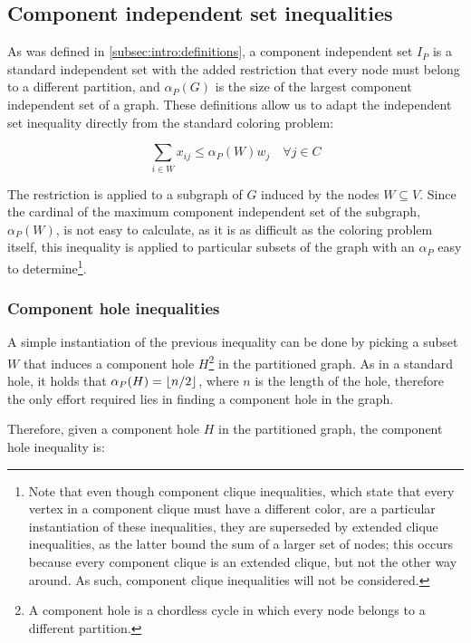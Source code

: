 \subsection{Component independent set inequalities}

As was defined in \ref{subsec:intro:definitions}, a component independent set $I_P$ is a standard independent set with the added restriction that every node must belong to a different partition, and $\alpha_P(G)$ is the size of the largest component independent set of a graph. These definitions allow us to adapt the independent set inequality directly from the standard coloring problem:

\begin{equation}
\label{ineq:ciset}
\sum _{i \in W} x_{ij} \leq \alpha_P(W) w_{j} \quad \forall j \in C
\end{equation}

The restriction is applied to a subgraph of $G$ induced by the nodes $W \subseteq V$. Since the cardinal of the maximum component independent set of the subgraph, $\alpha_P(W)$, is not easy to calculate, as it is as difficult as the coloring problem itself, this inequality is applied to particular subsets of the graph with an $\alpha_P$ easy to determine\footnote{Note that even though component clique inequalities, which state that every vertex in a component clique must have a different color, are a particular instantiation of these inequalities, they are superseded by extended clique inequalities, as the latter bound the sum of a larger set of nodes; this occurs because every component clique is an extended clique, but not the other way around. As such, component clique inequalities will not be considered.}.

\subsubsection{Component hole inequalities}

A simple instantiation of the previous inequality can be done by picking a subset $W$ that induces a component hole $H$\footnote{A component hole is a chordless cycle in which every node belongs to a different partition.} in the partitioned graph. As in a standard hole, it holds that $\alpha_P(H) = \left\lfloor n / 2 \right\rfloor$, where $n$ is the length of the hole, therefore the only effort required lies in finding a component hole in the graph.

Therefore, given a component hole $H$ in the partitioned graph, the component hole inequality is:

